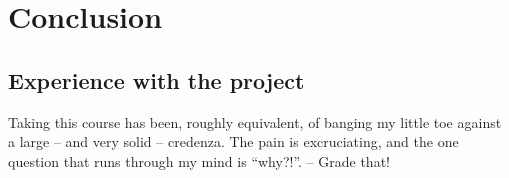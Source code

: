 \chapter{Conclusion}
\section{Experience with the project}
Taking this course has been, roughly equivalent, of banging my little toe against a large -- and very solid -- credenza. The pain is excruciating, and the one question that runs through my mind is ``why?!''. -- Grade that!

